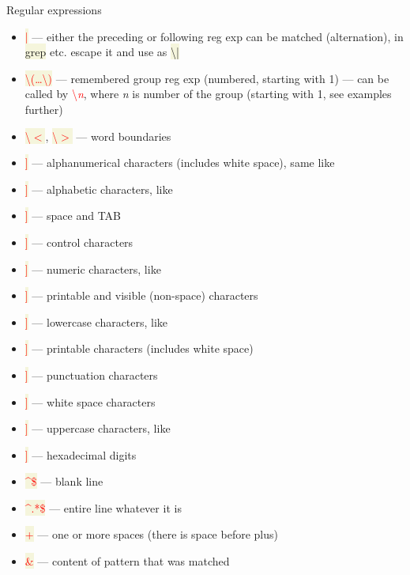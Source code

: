 \documentclass[compress, xelatex, 11pt, xcolor=svgnames, aspectratio=169,
	hyperref={
		bookmarks=true,
		unicode=true,
		colorlinks=true,
		pdftitle={Linux, command line and MetaCentrum},
		plainpages=false,
		pdfauthor={Vojtech Zeisek},
		pdfsubject={Course about use of Linux command line, writing shell scripts and using MetaCentrum of CESNET},
		pdfcreator={XeLaTeX},
		pdfkeywords={Linux, GNU, BASH, shell, command line, MetaCentrum},
		linkcolor=DarkRed, %
		anchorcolor=DarkBlue, %
		citecolor=Indigo, %
		filecolor=NavyBlue, %
		menucolor=DarkMagenta, %
		urlcolor=DarkBlue, %
		},
	url={hyphens, lowtilde} %
	]{beamer}
\renewcommand{\texttt}[1]{\colorbox{Beige}{{\ttfamily #1}}}
\renewcommand{\alert}[1]{\textcolor{red}{#1}}
\begin{document}
\begin{frame}[allowframebreaks]{Regular expressions}
\begin{itemize}
		\item \alert{\texttt{|}} --- either the preceding or following reg exp can be matched (alternation), in \texttt{grep} etc. escape it and use as \texttt{\textbackslash |}
		\item \alert{\texttt{\textbackslash(\ldots\textbackslash)}} --- remembered group reg exp (numbered, starting with 1) --- can be called by \alert{\textbackslash\textit{n}}, where \textit{n} is number of the group (starting with 1, see examples further)
		\item \alert{\texttt{\textbackslash$<$}}, \alert{\texttt{\textbackslash$>$}} --- word boundaries
		\item \alert{\texttt{[[:alnum:]]}} --- alphanumerical characters (includes white space), same like \texttt{[a-zA-Z0-9]}
		\item \alert{\texttt{[[:alpha:]]}} --- alphabetic characters, like \texttt{[a-zA-Z]}
		\item \alert{\texttt{[[:blank:]]}} --- space and TAB
		\item \alert{\texttt{[[:cntrl:]]}} --- control characters
		\item \alert{\texttt{[[:digit:]]}} --- numeric characters, like \texttt{[0-9]}
		\item \alert{\texttt{[[:graph:]]}} --- printable and visible (non-space) characters
		\item \alert{\texttt{[[:lower:]]}} --- lowercase characters, like \texttt{[a-z]}
		\item \alert{\texttt{[[:print:]]}} --- printable characters (includes white space)
		\item \alert{\texttt{[[:punct:]]}} --- punctuation characters
		\item \alert{\texttt{[[:space:]]}} --- white space characters
		\item \alert{\texttt{[[:upper:]]}} --- uppercase characters, like \texttt{[A-Z]}
		\item \alert{\texttt{[[:xdigit:]]}} --- hexadecimal digits
		\item \alert{\texttt{\textasciicircum\$}} --- blank line
		\item \alert{\texttt{\textasciicircum.*\$}} --- entire line whatever it is
		\item \alert{\texttt{ +}} --- one or more spaces (there is space before plus)
		\item \alert{\texttt{\&}} --- content of pattern that was matched
	\end{itemize}
\end{frame}
\end{document}
